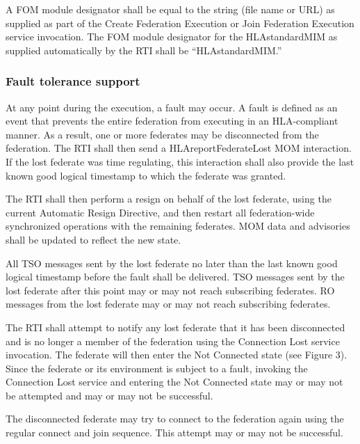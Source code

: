 A FOM module designator shall be equal to the string (file name or URL) as supplied as part of the Create Federation Execution or Join Federation Execution service invocation. The FOM module designator for the HLAstandardMIM as supplied automatically by the RTI shall be ``HLAstandardMIM.''

\subsubsection{Fault tolerance support}

At any point during the execution, a fault may occur. A fault is defined as an event that prevents the entire federation from executing in an HLA-compliant manner. As a result, one or more federates may be disconnected from the federation. The RTI shall then send a HLAreportFederateLost MOM interaction. If the lost federate was time regulating, this interaction shall also provide the last known good logical timestamp to which the federate was granted.

The RTI shall then perform a resign on behalf of the lost federate, using the current Automatic Resign Directive, and then restart all federation-wide synchronized operations with the remaining federates. MOM data and advisories shall be updated to reflect the new state.

All TSO messages sent by the lost federate no later than the last known good logical timestamp before the fault shall be delivered. TSO messages sent by the lost federate after this point may or may not reach subscribing federates. RO messages from the lost federate may or may not reach subscribing federates.

The RTI shall attempt to notify any lost federate that it has been disconnected and is no longer a member of the federation using the Connection Lost \rtiinitiated{} service invocation. The federate will then enter the Not Connected state (see Figure 3). Since the federate or its environment is subject to a fault, invoking the Connection Lost \rtiinitiated{} service and entering the Not Connected state may or may not be attempted and may or may not be successful.

The disconnected federate may try to connect to the federation again using the regular connect and join sequence. This attempt may or may not be successful.

\clearpage

